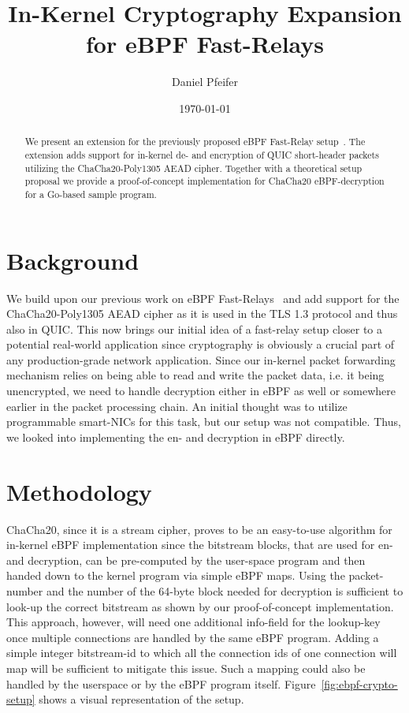 \documentclass[a4paper,12pt]{article}
\title{In-Kernel Cryptography Expansion \\ for eBPF Fast-Relays}
\author{Daniel Pfeifer}
\date{\today}
\begin{document}
\maketitle

\begin{abstract}
We present an extension for the previously proposed eBPF Fast-Relay setup~\parencite{fast-relays-thesis-repo}. 
The extension adds support for in-kernel de- and encryption of QUIC short-header packets utilizing the ChaCha20-Poly1305 AEAD cipher.
Together with a theoretical setup proposal we provide a proof-of-concept implementation for ChaCha20 eBPF-decryption for a Go-based 
sample program.
\end{abstract}


\section{Background}
We build upon our previous work on eBPF Fast-Relays~\parencite{fast-relays-thesis-repo} and add support for the 
ChaCha20-Poly1305 AEAD cipher as it is used in the TLS 1.3 protocol and thus also in QUIC\@.
This now brings our initial idea of a fast-relay setup closer to a potential real-world application since 
cryptography is obviously a crucial part of any production-grade network application. 
Since our in-kernel packet forwarding mechanism relies on being able to read and write the packet data, i.e.
it being unencrypted, we need to handle decryption either in eBPF as well or somewhere earlier in the packet processing chain.
An initial thought was to utilize programmable smart-NICs for this task, but our setup was not compatible. 
Thus, we looked into implementing the en- and decryption in eBPF directly.

\section{Methodology}
ChaCha20, since it is a stream cipher, proves to be an easy-to-use algorithm for in-kernel eBPF implementation since 
the bitstream blocks, that are used for en- and decryption, can be pre-computed by the user-space program and then handed 
down to the kernel program via simple eBPF maps.
Using the packet-number and the number of the 64-byte block needed for decryption is sufficient to look-up the correct bitstream 
as shown by our proof-of-concept implementation.
This approach, however, will need one additional info-field for the lookup-key once multiple connections are handled by the same
eBPF program.
Adding a simple integer bitstream-id to which all the connection ids of one connection will map will be sufficient to mitigate this issue.
Such a mapping could also be handled by the userspace or by the eBPF program itself.
Figure~\ref{fig:ebpf-crypto-setup} shows a visual representation of the setup. 
\end{document}
